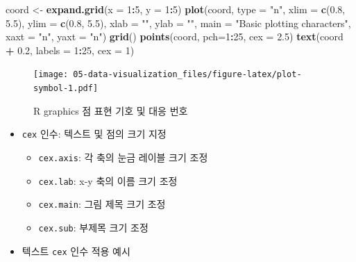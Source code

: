 \documentclass[
  11pt,
]{krantz}
\newenvironment{Shaded}{\begin{snugshade}}{\end{snugshade}}
\newcommand{\DataTypeTok}[1]{\textcolor[rgb]{0.27,0.27,0.27}{#1}}
\newcommand{\DecValTok}[1]{\textcolor[rgb]{0.06,0.06,0.06}{#1}}
\newcommand{\FloatTok}[1]{\textcolor[rgb]{0.06,0.06,0.06}{#1}}
\newcommand{\KeywordTok}[1]{\textcolor[rgb]{0.27,0.27,0.27}{\textbf{#1}}}
\newcommand{\NormalTok}[1]{#1}
\newcommand{\OperatorTok}[1]{\textcolor[rgb]{0.43,0.43,0.43}{\textbf{#1}}}
\newcommand{\StringTok}[1]{\textcolor[rgb]{0.5,0.5,0.5}{#1}}
\providecommand{\tightlist}{%
  \setlength{\itemsep}{0pt}\setlength{\parskip}{0pt}}
\begin{document}
\footnotesize

\begin{Shaded}
\begin{Highlighting}[]
\NormalTok{coord <-}\StringTok{ }\KeywordTok{expand.grid}\NormalTok{(}\DataTypeTok{x =} \DecValTok{1}\OperatorTok{:}\DecValTok{5}\NormalTok{, }\DataTypeTok{y =} \DecValTok{1}\OperatorTok{:}\DecValTok{5}\NormalTok{)}
\KeywordTok{plot}\NormalTok{(coord, }\DataTypeTok{type =} \StringTok{"n"}\NormalTok{, }
     \DataTypeTok{xlim =} \KeywordTok{c}\NormalTok{(}\FloatTok{0.8}\NormalTok{, }\FloatTok{5.5}\NormalTok{), }
     \DataTypeTok{ylim =} \KeywordTok{c}\NormalTok{(}\FloatTok{0.8}\NormalTok{, }\FloatTok{5.5}\NormalTok{), }
     \DataTypeTok{xlab =} \StringTok{""}\NormalTok{, }
     \DataTypeTok{ylab =} \StringTok{""}\NormalTok{, }
     \DataTypeTok{main =} \StringTok{"Basic plotting characters"}\NormalTok{, }
     \DataTypeTok{xaxt =} \StringTok{"n"}\NormalTok{, }
     \DataTypeTok{yaxt =} \StringTok{"n"}\NormalTok{)}
\KeywordTok{grid}\NormalTok{()}
\KeywordTok{points}\NormalTok{(coord, }\DataTypeTok{pch=}\DecValTok{1}\OperatorTok{:}\DecValTok{25}\NormalTok{, }\DataTypeTok{cex =} \FloatTok{2.5}\NormalTok{)}
\KeywordTok{text}\NormalTok{(coord }\OperatorTok{+}\StringTok{ }\FloatTok{0.2}\NormalTok{, }\DataTypeTok{labels =} \DecValTok{1}\OperatorTok{:}\DecValTok{25}\NormalTok{, }\DataTypeTok{cex =} \DecValTok{1}\NormalTok{)}
\end{Highlighting}
\end{Shaded}

\begin{figure}
\centering
\texttt{[image: 05-data-visualization\_files/figure-latex/plot-symbol-1.pdf]}
\caption{\label{fig:plot-symbol}R graphics 점 표현 기호 및 대응 번호}
\end{figure}

\normalsize

\begin{itemize}
\tightlist
\item
  \texttt{cex} 인수: 텍스트 및 점의 크기 지정

  \begin{itemize}
  \tightlist
  \item
    \texttt{cex.axis}: 각 축의 눈금 레이블 크기 조정
  \item
    \texttt{cex.lab}: x-y 축의 이름 크기 조정
  \item
    \texttt{cex.main}: 그림 제목 크기 조정
  \item
    \texttt{cex.sub}: 부제목 크기 조정
  \end{itemize}
\item
  텍스트 \texttt{cex} 인수 적용 예시
\end{itemize}
\end{document}
